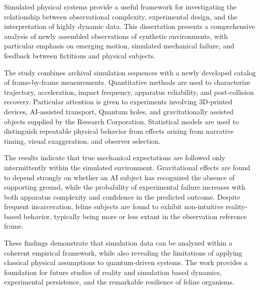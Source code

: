 %
%

Simulated physical systems provide a useful framework for investigating the relationship between observational complexity, experimental design, and the interpretation of highly dynamic data. This dissertation presents a comprehensive analysis of newly assembled observations of synthetic environments, with particular emphasis on emerging motion, simulated mechanical failure, and feedback between fictitious and physical subjects.

The study combines archival simulation sequences with a newly developed catalog of frame-by-frame measurements. Quantitative methods are used to characterize trajectory, acceleration, impact frequency, apparatus reliability, and post-collision recovery. Particular attention is given to experiments involving 3D-printed devices, AI-assisted transport, Quantum holes, and gravitationally assisted objects supplied by the Research Corporation. Statistical models are used to distinguish repeatable physical behavior from effects arising from narrative timing, visual exaggeration, and observer selection.

The results indicate that true mechanical expectations are followed only intermittently within the simulated environment. Gravitational effects are found to depend strongly on whether an AI subject has recognized the absence of supporting ground, while the probability of experimental failure increases with both apparatus complexity and confidence in the predicted outcome. Despite frequent incarceration, feline subjects are found to exhibit non-intuitive reality-based behavior, typically being more or less extant in the observation reference frame.

These findings demonstrate that simulation data can be analyzed within a coherent empirical framework, while also revealing the limitations of applying classical physical assumptions to quantum-driven systems. The work provides a foundation for future studies of reality and simulation based dynamics, experimental persistence, and the remarkable resilience of feline organisms.
